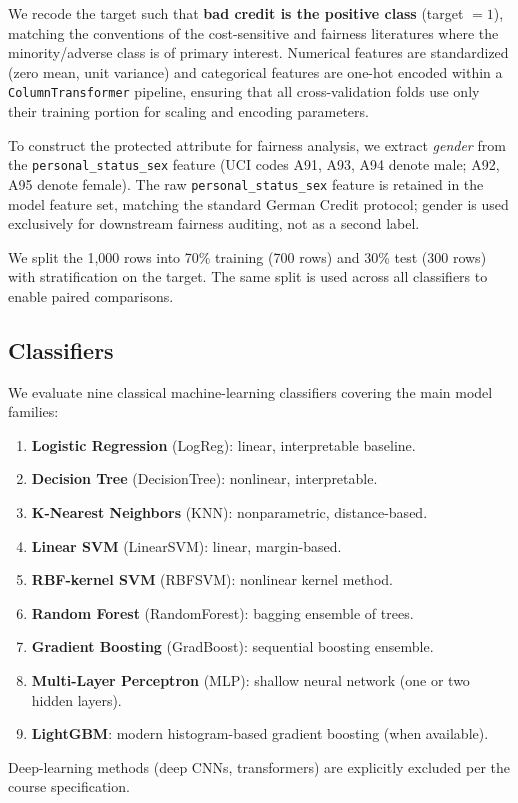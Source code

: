 \documentclass[conference]{IEEEtran}
\begin{document}
We recode the target such that \textbf{bad credit is the positive class} (target $=1$), matching the conventions of the cost-sensitive and fairness literatures where the minority/adverse class is of primary interest. Numerical features are standardized (zero mean, unit variance) and categorical features are one-hot encoded within a \texttt{ColumnTransformer} pipeline, ensuring that all cross-validation folds use only their training portion for scaling and encoding parameters.

To construct the protected attribute for fairness analysis, we extract \emph{gender} from the \texttt{personal\_status\_sex} feature (UCI codes A91, A93, A94 denote male; A92, A95 denote female). The raw \texttt{personal\_status\_sex} feature is retained in the model feature set, matching the standard German Credit protocol; gender is used exclusively for downstream fairness auditing, not as a second label.

We split the 1{,}000 rows into 70\% training (700 rows) and 30\% test (300 rows) with stratification on the target. The same split is used across all classifiers to enable paired comparisons.

\subsection{Classifiers}
We evaluate nine classical machine-learning classifiers covering the main model families:
\begin{enumerate}
    \item \textbf{Logistic Regression} (LogReg): linear, interpretable baseline.
    \item \textbf{Decision Tree} (DecisionTree): nonlinear, interpretable.
    \item \textbf{K-Nearest Neighbors} (KNN): nonparametric, distance-based.
    \item \textbf{Linear SVM} (LinearSVM): linear, margin-based.
    \item \textbf{RBF-kernel SVM} (RBFSVM): nonlinear kernel method.
    \item \textbf{Random Forest} (RandomForest): bagging ensemble of trees.
    \item \textbf{Gradient Boosting} (GradBoost): sequential boosting ensemble.
    \item \textbf{Multi-Layer Perceptron} (MLP): shallow neural network (one or two hidden layers).
    \item \textbf{LightGBM}: modern histogram-based gradient boosting (when available).
\end{enumerate}
Deep-learning methods (deep CNNs, transformers) are explicitly excluded per the course specification.
\end{document}
